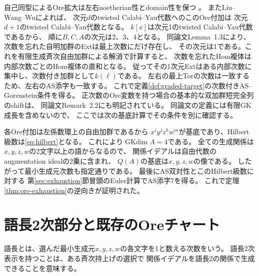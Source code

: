 \documentclass[11pt,a4paper]{ltjsarticle}
\theoremstyle{definition}
\newcommand{\GKdim}{\operatorname{GKdim}}
\begin{document}
自己同型によるOre拡大は左右noetherian性とdomain性を保つ
\cite[\S1.3]{LWW}。
またLiu--Wang--Wu\cite[Theorem~3.3]{LWW}によれば、
次元$d$のtwisted Calabi--Yau代数へのこのOre付加は
次元$d+1$のtwisted Calabi--Yau代数となる。
$k[x]$は次元1のtwisted Calabi--Yau代数であるから、
順に$B,C,A$の次元は2、3、4となる。
同論文Lemma~1.3により、次数を忘れた自明加群のExtは最上次数にだけ存在し、
その次元は1である。これを有限生成斉次自由加群による解消で計算すると、
次数を忘れたHom複体は内部次数ごとのHom複体の直和となる。
従ってその1次元Extはある内部次数に集中し、次数付き加群として$k(\ell)$である。
左右の最上Torの次数は一致するため、左右のAS添字も一致する。
これで定義\ref{def:graded-target}の次数付きAS--Gorenstein条件を得る。
正次数のOre変数を持つ場合の基本的な双加群短完全列のshiftは、
同論文Remark~2.2にも明記されている。
同論文の定義には有限GK成長を含めないので、
ここでは次の基底計算でその条件を別に確認する。

各Ore付加は左係数環上の自由加群であるから
$x^iy^jz^hw^m$が基底であり、Hilbert級数は\eqref{eq:hilbert}となる。
これにより$\GKdim A=4$である。
全ての生成関係は$x,y,z,w$の2文字以上の語からなるので、
関係イデアルは自由代数のaugmentation idealの2乗に含まれ、
$Q(A)$の基底は$x,y,z,w$の像である。
したがって最小生成元次数も指定通りである。
最後にAS双対性とこのHilbert級数に対する
第\ref{sec:exhaustion}節冒頭のEuler計算でAS添字7を得る。
これで定理\ref{thm:ore-exhaustion}の逆向きが証明された。

\section{語長2次部分と既存のOreチャート}\label{sec:quadratic}
語長とは、選んだ最小生成元$x,y,z,w$の各文字を1と数える次数をいう。
語長2次表示を持つことは、ある斉次持上げの選択で
関係イデアルを語長2の関係で生成できることを意味する。
\end{document}

